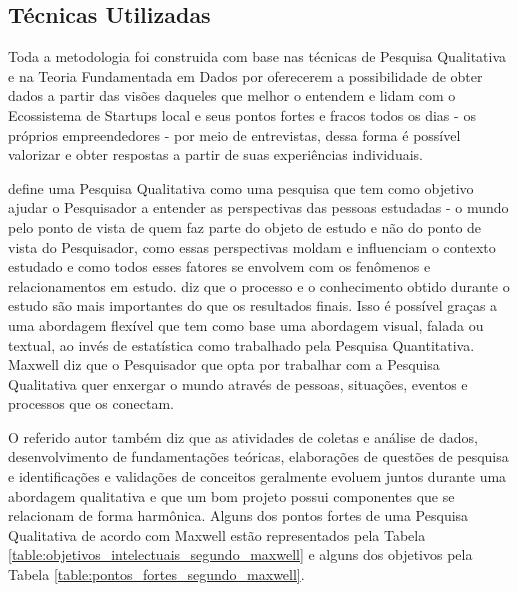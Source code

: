 \subsection{Técnicas Utilizadas}
\label{subsection:tecnicas_utilizadas}

Toda a metodologia foi construida com base nas técnicas de Pesquisa Qualitativa e na Teoria Fundamentada em Dados por oferecerem a possibilidade de obter dados a partir das visões daqueles que melhor o entendem e lidam com o Ecossistema de Startups local e seus pontos fortes e fracos todos os dias - os próprios empreendedores - por meio de entrevistas, dessa forma é possível valorizar e obter respostas a partir de suas experiências individuais.

 define uma Pesquisa Qualitativa como uma pesquisa que tem como objetivo ajudar o Pesquisador a entender as perspectivas das pessoas estudadas - o mundo pelo ponto de vista de quem faz parte do objeto de estudo e não do ponto de vista do Pesquisador, como essas perspectivas moldam e influenciam o contexto estudado e como todos esses fatores se envolvem com os fenômenos e relacionamentos em estudo.  diz que o processo e o conhecimento obtido durante o estudo são mais importantes do que os resultados finais. Isso é possível graças a uma abordagem flexível que tem como base uma abordagem visual, falada ou textual, ao invés de estatística como trabalhado pela Pesquisa Quantitativa. Maxwell diz que o Pesquisador que opta por trabalhar com a Pesquisa Qualitativa quer enxergar o mundo através de pessoas, situações, eventos e processos que os conectam.

O referido autor também diz que as atividades de coletas e análise de dados, desenvolvimento de fundamentações teóricas, elaborações de questões de pesquisa e identificações e validações de conceitos geralmente evoluem juntos durante uma abordagem qualitativa e que um bom projeto possui componentes que se relacionam de forma harmônica. Alguns dos pontos fortes de uma Pesquisa Qualitativa de acordo com Maxwell estão representados pela Tabela \ref{table:objetivos_intelectuais_segundo_maxwell} e alguns dos objetivos pela Tabela \ref{table:pontos_fortes_segundo_maxwell}.

